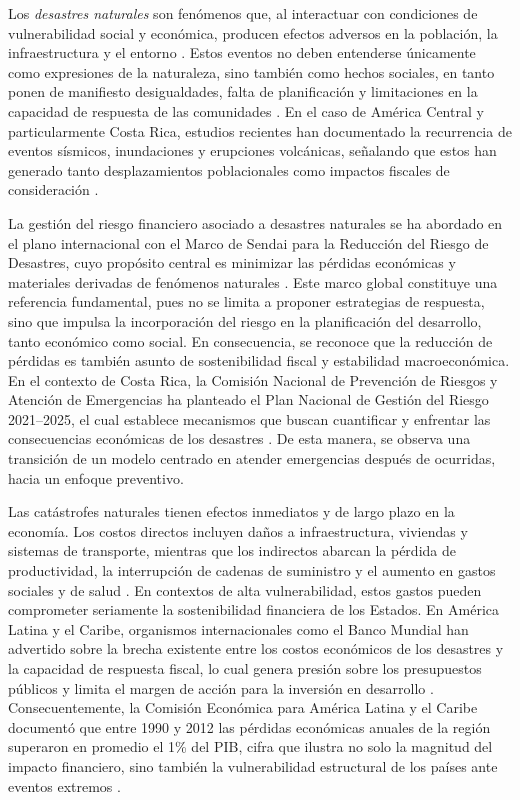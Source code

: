 \documentclass[12pt, a4paper]{article}
\begin{document}
Los \textit{desastres naturales} son fenómenos que, al interactuar con condiciones de vulnerabilidad social y económica, producen efectos adversos en la población, la infraestructura y el entorno \cite{Paniagua1995}. Estos eventos no deben entenderse únicamente como expresiones de la naturaleza, sino también como hechos sociales, en tanto ponen de manifiesto desigualdades, falta de planificación y limitaciones en la capacidad de respuesta de las comunidades \cite{PerezMallaina2005}. En el caso de América Central y particularmente Costa Rica, estudios recientes han documentado la recurrencia de eventos sísmicos, inundaciones y erupciones volcánicas, señalando que estos han generado tanto desplazamientos poblacionales como impactos fiscales de consideración \cite{CentenoMorales2017,OrozcoMontoya2022}.

La gestión del riesgo financiero asociado a desastres naturales se ha abordado en el plano internacional con el Marco de Sendai para la Reducción del Riesgo de Desastres, cuyo propósito central es minimizar las pérdidas económicas y materiales derivadas de fenómenos naturales \cite{undrr2015}. Este marco global constituye una referencia fundamental, pues no se limita a proponer estrategias de respuesta, sino que impulsa la incorporación del riesgo en la planificación del desarrollo, tanto económico como social. En consecuencia, se reconoce que la reducción de pérdidas es también asunto de sostenibilidad fiscal y estabilidad macroeconómica. En el contexto de Costa Rica, la Comisión Nacional de Prevención de Riesgos y Atención de Emergencias ha planteado el Plan Nacional de Gestión del Riesgo 2021–2025, el cual establece mecanismos que buscan cuantificar y enfrentar las consecuencias económicas de los desastres \cite{cne2022}. De esta manera, se observa una transición de un modelo centrado en atender emergencias después de ocurridas, hacia un enfoque preventivo.

Las catástrofes naturales tienen efectos inmediatos y de largo plazo en la economía. Los costos directos incluyen daños a infraestructura, viviendas y sistemas de transporte, mientras que los indirectos abarcan la pérdida de productividad, la interrupción de cadenas de suministro y el aumento en gastos sociales y de salud \cite{Paniagua1995}. En contextos de alta vulnerabilidad, estos gastos pueden comprometer seriamente la sostenibilidad financiera de los Estados. En América Latina y el Caribe, organismos internacionales como el Banco Mundial han advertido sobre la brecha existente entre los costos económicos de los desastres y la capacidad de respuesta fiscal, lo cual genera presión sobre los presupuestos públicos y limita el margen de acción para la inversión en desarrollo \cite[p. 23]{bancamundial2021}. Consecuentemente, la Comisión Económica para América Latina y el Caribe documentó que entre 1990 y 2012 las pérdidas económicas anuales de la región superaron en promedio el 1\% del PIB, cifra que ilustra no solo la magnitud del impacto financiero, sino también la vulnerabilidad estructural de los países ante eventos extremos \cite[p. 45]{cepal2014}.
\end{document}
